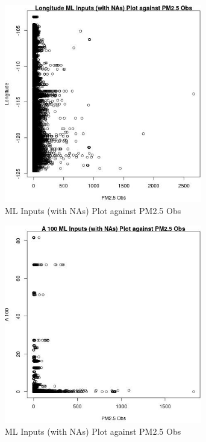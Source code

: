 \begin{figure} 
\centering  
\includegraphics[width=0.77\textwidth]{Code_Outputs/Report_ML_input_PM25_Step4_part_e_de_duplicated_aveswNAs_LongitudevPM25_Obs.jpg} 
\caption{\label{fig:Report_ML_input_PM25_Step4_part_e_de_duplicated_aveswNAsLongitudevPM25_Obs}ML Inputs (with NAs) Plot against PM2.5 Obs} 
\end{figure} 
 

\begin{figure} 
\centering  
\includegraphics[width=0.77\textwidth]{Code_Outputs/Report_ML_input_PM25_Step4_part_e_de_duplicated_aveswNAs_A_100vPM25_Obs.jpg} 
\caption{\label{fig:Report_ML_input_PM25_Step4_part_e_de_duplicated_aveswNAsA_100vPM25_Obs}ML Inputs (with NAs) Plot against PM2.5 Obs} 
\end{figure} 
 

